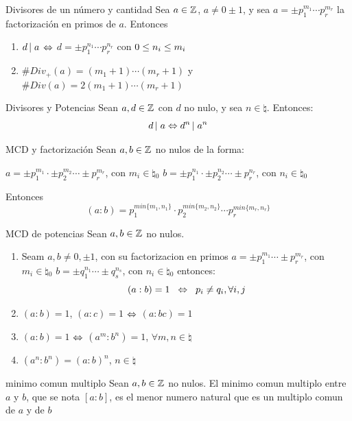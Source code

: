 \documentclass[10pt]{article}
\begin{document}
\begin{propo}{Divisores de un número y cantidad}
 Sea $a \in \entero{}$, $a \neq 0 \pm 1$, y sea $a = \pm p_1^{m_1} \cdots p_r^{m_r}$ la factorización en primos de $a$. Entonces
 \begin{enumerate}
  \item $\divi{d}{a}$ $\sii$ $d = \pm p_1^{n_1} \cdots p_r^{n_r}$ con $0 \menig n_i \menig m_i$
  \item $\# Div_+(a) = (m_1 + 1) \cdots (m_r + 1)$ y $\# Div(a) =2 (m_1 + 1) \cdots (m_r + 1)$ 
 \end{enumerate}
\end{propo}

\begin{propo}{Divisores y Potencias}
 Sean $a,d \in \entero{}$ con $d$ no nulo, y sea $n \in \natural{}$. Entonces:
 \[\divi{d}{a} \sii \divi{d^n}{a^n}\]
\end{propo}

\begin{propo}{MCD y factorización}
Sean $a, b \in \entero{}$ no nulos de la forma:
\begin{center}
 $a = \pm p_1^{m_1} \cdot \pm p_2^{m_2} \cdots \pm p_r^{m_r}$, con $m_i \in \natural{}_0$
 $b = \pm p_1^{n_1} \cdot \pm p_2^{n_2} \cdots \pm p_r^{n_r}$, con $n_i \in \natural{}_0$
 \end{center}
  Entonces
  \[(a:b) = p_1^{min\{m_1, n_1\}} \cdot p_2^{min\{m_2, n_2\}} \cdots  p_r^{min\{m_r, n_r\}}\]
\end{propo}

\begin{cor}{MCD de potencias}
Sean $a, b \in \entero{}$ no nulos.
\begin{enumerate}
 \item Seam $a,b \neq 0, \pm 1$, con su factorizacion en primos $a = \pm p_1^{m_1}  \cdots \pm p_r^{m_r}$, con $m_i \in \natural{}_0$
 $b = \pm q_1^{n_1}  \cdots \pm q_s^{n_s}$, con $n_i \in \natural{}_0$ entonces:
 \[(a:b)=1 \es{0.2} \sii \es{0.2} p_i \neq q_i, \forall i, j\]
 \item $(a:b)=1$, $(a:c)=1$ $\sii$ $(a:bc)=1$
 \item $(a:b)=1$ $\sii$ $(a^m:b^n)=1$, $\forall m,n \in \natural{}$
 \item $(a^n: b^n) = (a:b)^n$, $n \in \natural{}$
 \end{enumerate}
\end{cor}

\begin{defi}{minimo comun multiplo}
 Sean $a, b \in \entero{}$ no nulos. El minimo comun multiplo entre $a$ y $b$, que se nota $[a:b]$, es el menor numero natural que es un multiplo comun de $a$ y de $b$
\end{defi}
\end{document}
